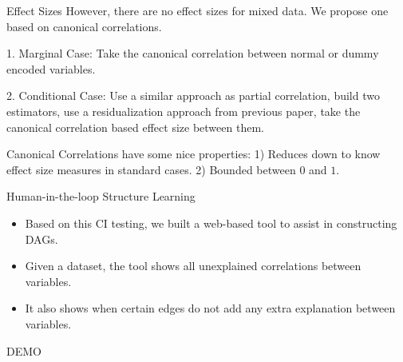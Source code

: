 \documentclass{beamer}
\begin{document}
\begin{frame}{Effect Sizes}
	However, there are no effect sizes for mixed data. We propose one based on
	canonical correlations.

	1. Marginal Case: Take the canonical correlation between normal or dummy encoded variables.

	2. Conditional Case: Use a similar approach as partial correlation, build two 
		estimators, use a residualization approach from previous paper, take
		the canonical correlation based effect size between them.


\end{frame}

\begin{frame}

	Canonical Correlations have some nice properties: 1) Reduces down to know effect size measures in standard cases. 2) Bounded between $ 0 $ and $ 1 $.

\end{frame}

\begin{frame}{Human-in-the-loop Structure Learning}
	\begin{itemize}
		\item Based on this CI testing, we built a web-based tool to assist in constructing DAGs.
		\item Given a dataset, the tool shows all unexplained correlations between variables.
		\item It also shows when certain edges do not add any extra explanation between variables.
	\end{itemize}
\end{frame}

\begin{frame}
	\center \huge DEMO
\end{frame}
\end{document}

